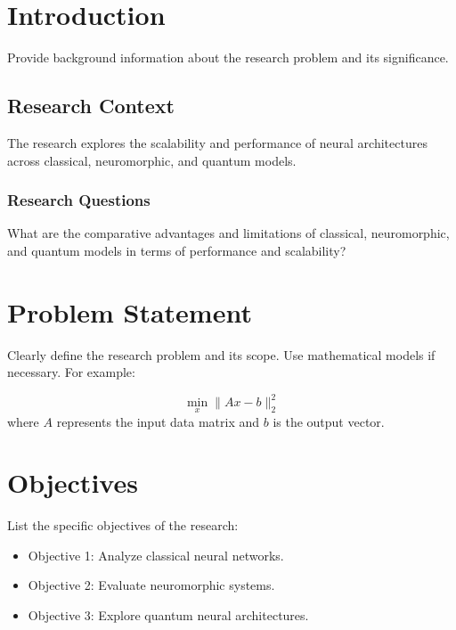 \documentclass[12pt, a4paper]{report}
\begin{document}
\clearpage

\chapter{Introduction}

\pagestyle{plain} %

Provide background information about the research problem and its significance.


\section{Research Context}
The research explores the scalability and performance of neural architectures across classical, neuromorphic, and quantum models.

\subsection{Research Questions}
What are the comparative advantages and limitations of classical, neuromorphic, and quantum models in terms of performance and scalability?

\chapter{Problem Statement}
Clearly define the research problem and its scope. Use mathematical models if necessary. For example:

\[
    \min_x \|Ax - b\|_2^2
\]
where \(A\) represents the input data matrix and \(b\) is the output vector.

\chapter{Objectives}
List the specific objectives of the research:
\begin{itemize}
    \item Objective 1: Analyze classical neural networks.
    \item Objective 2: Evaluate neuromorphic systems.
    \item Objective 3: Explore quantum neural architectures.
\end{itemize}
\end{document}

